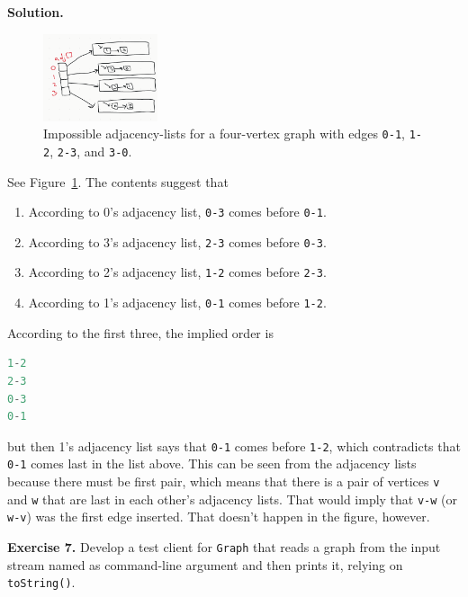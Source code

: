 \documentclass[12pt, a4paper]{article}
\newenvironment{ex}[2][Exercise]
{\par\medskip\noindent \textbf{#1 #2.}}
{\medskip}
\newenvironment{sol}[1][Solution]
{\par\medskip\noindent \textbf{#1.} }
{\medskip}
\begin{document}
	\begin{sol}
		\begin{figure}
			\centering
			\includegraphics[width=0.3\textwidth]{exercise-06}
			\caption{Impossible adjacency-lists for a four-vertex graph with edges
			\texttt{0-1}, \texttt{1-2}, \texttt{2-3}, and \texttt{3-0}.}
			\label{fig:ex-06}
		\end{figure}
		See Figure~\ref{fig:ex-06}. The contents suggest that
		\begin{enumerate}
			\item According to 0's adjacency list, \texttt{0-3} comes before \texttt{0-1}.
			\item According to 3's adjacency list, \texttt{2-3} comes before \texttt{0-3}.
			\item According to 2's adjacency list, \texttt{1-2} comes before \texttt{2-3}.
			\item According to 1's adjacency list, \texttt{0-1} comes before \texttt{1-2}.
		\end{enumerate}
		According to the first three, the implied order is
		\begin{lstlisting}[language=java]
1-2
2-3
0-3
0-1
		\end{lstlisting}
		but then 1's adjacency list says that \texttt{0-1} comes before \texttt{1-2},
		which contradicts that \texttt{0-1} comes last in the list above. This can
		be seen from the adjacency lists because there must be first pair, which means
		that there is a pair of vertices \texttt{v} and \texttt{w} that are last in each
		other's adjacency lists. That would imply that \texttt{v-w} (or \texttt{w-v})
		was the first edge inserted. That doesn't happen in the figure, however.
	\end{sol}
	\begin{ex}{7}
		Develop a test client for \texttt{Graph} that reads a graph from the input stream
		named as command-line argument and then prints it, relying on \texttt{toString()}.
	\end{ex}
	\pagebreak
	\printbibliography
\end{document}
